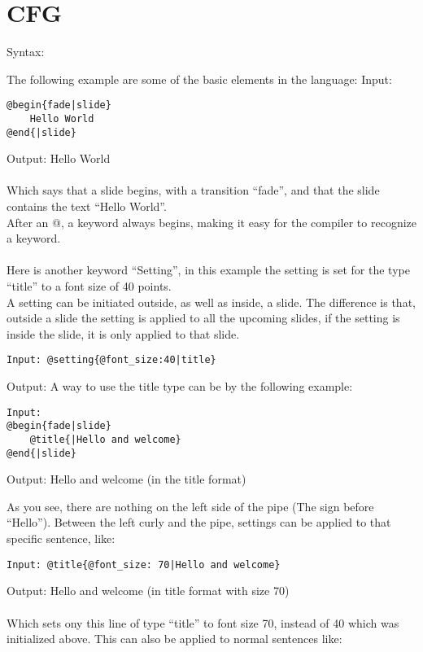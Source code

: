 \chapter{CFG}
Syntax:

The following example are some of the basic elements in the language:
Input:

\begin{verbatim}
@begin{fade|slide}
    Hello World
@end{|slide}
\end{verbatim}

Output: Hello World
\\ \\
Which says that a slide begins, with a transition ``fade'', and that the slide contains the text ``Hello World''. \\
After an @, a keyword always begins, making it easy for the compiler to recognize a keyword.
\\ \\
Here is another keyword ``Setting'', in this example the setting is set for the type ``title'' to a font size of 40 points. \\
A setting can be initiated outside, as well as inside, a slide. The difference is that, outside a slide the setting is applied to all the upcoming slides, if the setting is inside the slide, it is only applied to that slide.

\begin{verbatim}
Input: @setting{@font_size:40|title}
\end{verbatim}

Output: A way to use the title type can be by the following example:

\begin{verbatim}
Input:
@begin{fade|slide}
    @title{|Hello and welcome}
@end{|slide}
\end{verbatim}Output: Hello and welcome (in the title format)

As you see, there are nothing on the left side of the pipe (The sign before ``Hello''). Between the left curly and the pipe, settings can be applied to that specific sentence, like:

\begin{verbatim}
Input: @title{@font_size: 70|Hello and welcome}
\end{verbatim}

Output: Hello and welcome (in title format with size 70)
\\ \\
Which sets ony this line of type ``title'' to font size 70, instead of 40 which was initialized above. This can also be applied to normal sentences like:

